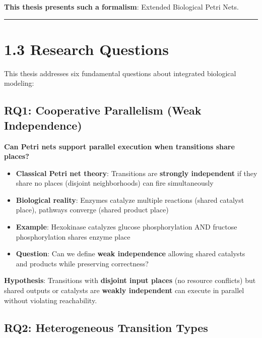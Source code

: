 \textbf{This thesis presents such a formalism}: Extended Biological
Petri Nets.

\begin{center}\rule{0.5\linewidth}{0.5pt}\end{center}

\hypertarget{research-questions}{%
\section{1.3 Research Questions}\label{research-questions}}

This thesis addresses six fundamental questions about integrated
biological modeling:

\hypertarget{rq1-cooperative-parallelism-weak-independence}{%
\subsection{RQ1: Cooperative Parallelism (Weak
Independence)}\label{rq1-cooperative-parallelism-weak-independence}}

\textbf{Can Petri nets support parallel execution when transitions share
places?}

\begin{itemize}
\tightlist
\item
  \textbf{Classical Petri net theory}: Transitions are \textbf{strongly
  independent} if they share no places (disjoint neighborhoods) \textrightarrow can
  fire simultaneously
\item
  \textbf{Biological reality}: Enzymes catalyze multiple reactions
  (shared catalyst place), pathways converge (shared product place)
\item
  \textbf{Example}: Hexokinase catalyzes glucose phosphorylation AND
  fructose phosphorylation \textrightarrow shares enzyme place
\item
  \textbf{Question}: Can we define \textbf{weak independence} allowing
  shared catalysts and products while preserving correctness?
\end{itemize}

\textbf{Hypothesis}: Transitions with \textbf{disjoint input places} (no
resource conflicts) but shared outputs or catalysts are \textbf{weakly
independent} \textrightarrow can execute in parallel without violating reachability.

\hypertarget{rq2-heterogeneous-transition-types}{%
\subsection{RQ2: Heterogeneous Transition
Types}\label{rq2-heterogeneous-transition-types}}

